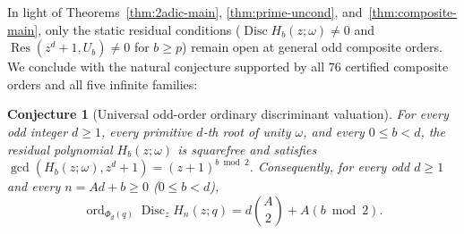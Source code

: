 \documentclass[11pt,reqno]{amsart}
\numberwithin{equation}{section}
\newtheorem{conjecture}[theorem]{Conjecture}
\theoremstyle{definition}
\theoremstyle{remark}
\newcommand{\Disc}{\operatorname{Disc}}
\newcommand{\Res}{\operatorname{Res}}
\newcommand{\ord}{\operatorname{ord}}
\begin{document}
In light of Theorems~\ref{thm:2adic-main}, \ref{thm:prime-uncond}, and~\ref{thm:composite-main}, only the static residual conditions ($\Disc H_b(z;\omega)\neq 0$ and $\Res(z^d+1, U_b)\neq 0$ for $b\ge p$) remain open at general odd composite orders. We conclude with the natural conjecture supported by all $76$ certified composite orders and all five infinite families:

\begin{conjecture}[Universal odd-order ordinary discriminant valuation]
\label{conj:all-odd}
For every odd integer $d\ge 1$, every primitive $d$-th root of unity $\omega$, and every $0\le b<d$, the residual polynomial $H_b(z;\omega)$ is squarefree and satisfies $\gcd(H_b(z;\omega),z^d+1)=(z+1)^{b\bmod 2}$. Consequently, for every odd $d\ge 1$ and every $n=Ad+b\ge 0$ ($0\le b<d$),
\[
\ord_{\Phi_d(q)} \Disc_z H_n(z;q) = d\binom{A}{2} + A(b\bmod 2).
\]
\end{conjecture}
\end{document}
